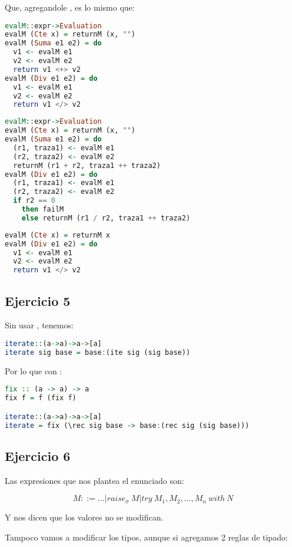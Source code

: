 Que, agregandole , es lo mismo que:

\begin{lstlisting}[language=Haskell]
evalM::expr->Evaluation
evalM (Cte x) = returnM (x, "")
evalM (Suma e1 e2) = do
  v1 <- evalM e1
  v2 <- evalM e2
  return v1 <+> v2
evalM (Div e1 e2) = do
  v1 <- evalM e1
  v2 <- evalM e2
  return v1 </> v2
\end{lstlisting}

\begin{lstlisting}[language=Haskell]
evalM::expr->Evaluation
evalM (Cte x) = returnM (x, "")
evalM (Suma e1 e2) = do
  (r1, traza1) <- evalM e1
  (r2, traza2) <- evalM e2
  returnM (r1 + r2, traza1 ++ traza2)
evalM (Div e1 e2) = do
  (r1, traza1) <- evalM e1
  (r2, traza2) <- evalM e2
  if r2 == 0
    then failM
    else returnM (r1 / r2, traza1 ++ traza2)
\end{lstlisting}

\begin{lstlisting}[language=Haskell]
evalM (Cte x) = returnM x
evalM (Div e1 e2) = do
  v1 <- evalM e1
  v2 <- evalM e2
  return v1 </> v2
\end{lstlisting}

\subsection*{Ejercicio 5} Sin usar , tenemos:
\begin{lstlisting}[language=Haskell]
iterate::(a->a)->a->[a]
iterate sig base = base:(ite sig (sig base))
\end{lstlisting}

Por lo que con :
\begin{lstlisting}[language=Haskell]
fix :: (a -> a) -> a
fix f = f (fix f)

iterate::(a->a)->a->[a]
iterate = fix (\rec sig base -> base:(rec sig (sig base)))
\end{lstlisting}

\subsection*{Ejercicio 6}
Las expresiones que nos plantea el enunciado son:

\[M ::= \dots \vert raise_\sigma\ M \vert try\ M_1, M_2, \dots, M_n\ with\ N\]

Y nos dicen que los valores no se modifican.

Tampoco vamos a modificar los tipos, aunque si agregamos 2 reglas de tipado:

